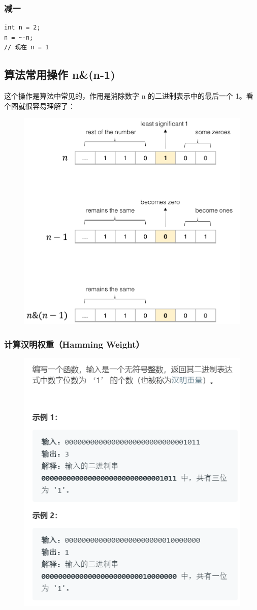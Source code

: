 \documentclass[12pt]{article}
\begin{document}
\subsubsection{减一}
\begin{lstlisting}
int n = 2;
n = ~-n;
// 现在 n = 1
\end{lstlisting}

\subsection{算法常用操作 n\&(n-1)}
这个操作是算法中常见的，作用是消除数字 n 的二进制表示中的最后一个 1。看个图就很容易理解了：
\begin{figure}[H]
    \centering
    \includegraphics[width=.5\textwidth]{fig/Big_Operations_1.png}
\end{figure}

\subsubsection{计算汉明权重（Hamming Weight）}
\begin{figure}[H]
    \centering
    \includegraphics[width=.5\textwidth]{fig/Big_Operations_2.png}
\end{figure}
\end{document}
